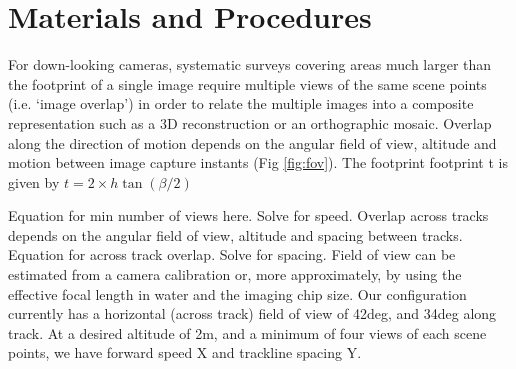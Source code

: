 \section{Materials and Procedures}


For down-looking cameras, systematic surveys covering areas much larger than the footprint of a single image require multiple views of the same scene points (i.e. `image overlap') in order to relate the multiple images into a composite representation such as a 3D reconstruction or an orthographic mosaic. Overlap along the direction of motion depends on the angular field of view, altitude and motion between image capture instants (Fig \ref{fig:fov}). The footprint footprint t is given by $t = 2\times h \tan(\beta/2)$

Equation for min number of views here. Solve for speed.
Overlap across tracks depends on the angular field of view, altitude and spacing between tracks. 
Equation for across track overlap. Solve for spacing.
Field of view can be estimated from a camera calibration or, more approximately, by using the effective focal length in water and the imaging chip size. Our configuration currently has a horizontal (across track) field of view of 42deg, and 34deg along track. At a desired altitude of 2m, and a minimum of four views of each scene points, we have forward speed X and trackline spacing Y. 
